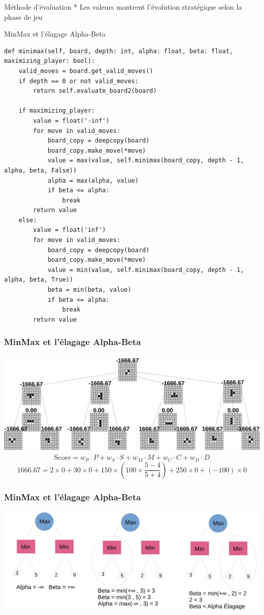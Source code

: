 \begin{frame}[t]{Méthode d'évaluation}
    \vspace{0.1cm}
    \centering
    \tiny
    * Les valeurs montrent l'évolution stratégique selon la phase de jeu
\end{frame}

\begin{frame}[t,fragile]{MinMax et l'élagage Alpha-Beta}
    \hspace{0.15\textwidth}
    \begin{lstlisting}[basicstyle=\tiny, mathescape=false]
def minimax(self, board, depth: int, alpha: float, beta: float, maximizing_player: bool):
    valid_moves = board.get_valid_moves()
    if depth == 0 or not valid_moves:
        return self.evaluate_board2(board)

    if maximizing_player:
        value = float('-inf')
        for move in valid_moves:
            board_copy = deepcopy(board)
            board_copy.make_move(*move)
            value = max(value, self.minimax(board_copy, depth - 1, alpha, beta, False))
            alpha = max(alpha, value)
            if beta <= alpha:
                break  
        return value
    else:
        value = float('inf')
        for move in valid_moves:
            board_copy = deepcopy(board)
            board_copy.make_move(*move)
            value = min(value, self.minimax(board_copy, depth - 1, alpha, beta, True))
            beta = min(beta, value)
            if beta <= alpha:
                break 
        return value
    \end{lstlisting}
\end{frame}

\begin{frame}
    \frametitle{MinMax et l'élagage Alpha-Beta}
    \centering
    \includegraphics[width=1\textwidth]{img/minmax_eval.jpg}
    \[
    \mathrm{Score} = w_P \cdot P + w_S \cdot S + w_M \cdot M + w_C \cdot C + w_D \cdot D
    \]
    \begin{equation*}
    1666.67 = 2 \times 0 + 30 \times 0 + 150 \times \left(100 \times \frac{5-4}{5+4}\right) + 250 \times 0 + (-100) \times 0
    \end{equation*}
\end{frame}

\begin{frame}
    \frametitle{MinMax et l'élagage Alpha-Beta}
    \centering
    \includegraphics[width=1\textwidth]{img/alphabeta.jpg}
\end{frame}